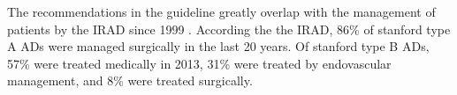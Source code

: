 \documentclass[thesis.tex]{subfiles}
\begin{document}
The recommendations in the guideline greatly overlap with the management of patients by the IRAD since 1999 \cite{doi:10.1161/CIRCULATIONAHA.117.031264}. According the the IRAD, 86\% of stanford type A ADs were managed surgically in the last 20 years. Of stanford type B ADs, 57\% were treated medically in 2013, 31\% were treated by endovascular management, and 8\% were treated surgically.  



\subfilebib %
\end{document}
